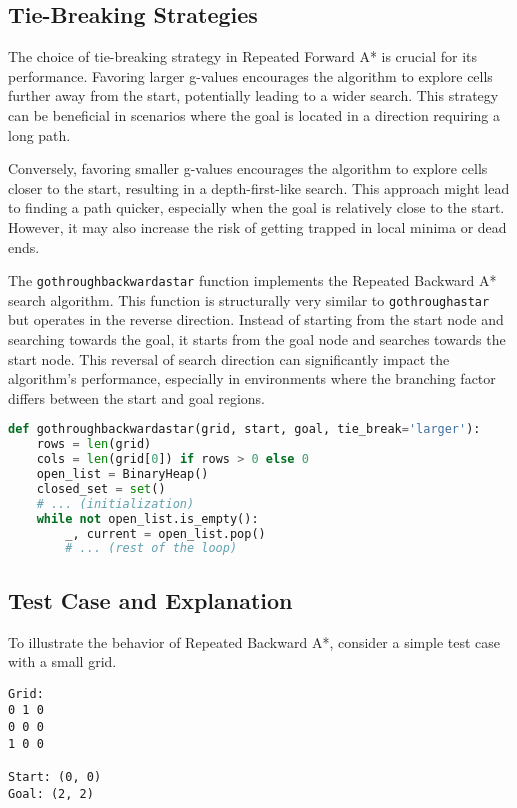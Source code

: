 \documentclass[12pt]{article}
\begin{document}
\subsection{Tie-Breaking Strategies}

The choice of tie-breaking strategy in Repeated Forward A* is crucial for its performance. Favoring larger g-values encourages the algorithm to explore cells further away from the start, potentially leading to a wider search. This strategy can be beneficial in scenarios where the goal is located in a direction requiring a long path.

Conversely, favoring smaller g-values encourages the algorithm to explore cells closer to the start, resulting in a depth-first-like search. This approach might lead to finding a path quicker, especially when the goal is relatively close to the start. However, it may also increase the risk of getting trapped in local minima or dead ends.

The \texttt{gothroughbackwardastar} function implements the Repeated Backward A* search algorithm. This function is structurally very similar to \texttt{gothroughastar} but operates in the reverse direction. Instead of starting from the start node and searching towards the goal, it starts from the goal node and searches towards the start node. This reversal of search direction can significantly impact the algorithm's performance, especially in environments where the branching factor differs between the start and goal regions.

\begin{lstlisting}[language=Python, basicstyle=\ttfamily]
def gothroughbackwardastar(grid, start, goal, tie_break='larger'):
    rows = len(grid)
    cols = len(grid[0]) if rows > 0 else 0
    open_list = BinaryHeap()
    closed_set = set()
    # ... (initialization)
    while not open_list.is_empty():
        _, current = open_list.pop()
        # ... (rest of the loop)
\end{lstlisting}

\subsection{Test Case and Explanation}

To illustrate the behavior of Repeated Backward A*, consider a simple test case with a small grid.

\begin{verbatim}
Grid:
0 1 0
0 0 0
1 0 0

Start: (0, 0)
Goal: (2, 2)
\end{verbatim}
\end{document}
